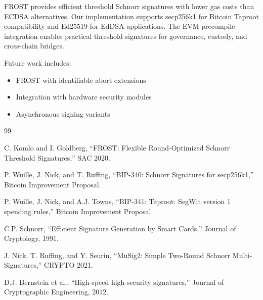 \documentclass[11pt,a4paper]{article}
\theoremstyle{definition}
\begin{document}
FROST provides efficient threshold Schnorr signatures with lower gas costs than ECDSA alternatives. Our implementation supports secp256k1 for Bitcoin Taproot compatibility and Ed25519 for EdDSA applications. The EVM precompile integration enables practical threshold signatures for governance, custody, and cross-chain bridges.

Future work includes:
\begin{itemize}
\item FROST with identifiable abort extensions
\item Integration with hardware security modules
\item Asynchronous signing variants
\end{itemize}


\begin{thebibliography}{99}

C. Komlo and I. Goldberg, ``FROST: Flexible Round-Optimized Schnorr Threshold Signatures,'' SAC 2020.

P. Wuille, J. Nick, and T. Ruffing, ``BIP-340: Schnorr Signatures for secp256k1,'' Bitcoin Improvement Proposal.

P. Wuille, J. Nick, and A.J. Towns, ``BIP-341: Taproot: SegWit version 1 spending rules,'' Bitcoin Improvement Proposal.

C.P. Schnorr, ``Efficient Signature Generation by Smart Cards,'' Journal of Cryptology, 1991.

J. Nick, T. Ruffing, and Y. Seurin, ``MuSig2: Simple Two-Round Schnorr Multi-Signatures,'' CRYPTO 2021.

D.J. Bernstein et al., ``High-speed high-security signatures,'' Journal of Cryptographic Engineering, 2012.

\end{thebibliography}
\end{document}
